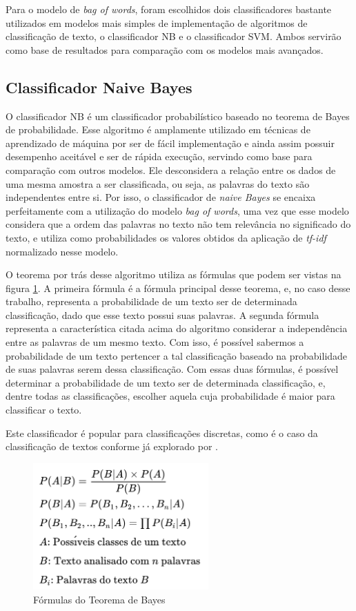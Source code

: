Para o modelo de \textit{bag of words}, foram escolhidos dois classificadores bastante utilizados em modelos mais simples de implementação de algoritmos de classificação de texto, o classificador NB e o classificador SVM. Ambos servirão como base de resultados para comparação com os modelos mais avançados.

\subsection{Classificador Naive Bayes}
\label{theoretical_NB}
O classificador NB é um classificador probabilístico baseado no teorema de Bayes de probabilidade. Esse algoritmo é amplamente utilizado em técnicas de aprendizado de máquina por ser de fácil implementação e ainda assim possuir desempenho aceitável e ser de rápida execução, servindo como base para comparação com outros modelos. Ele desconsidera a relação entre os dados de uma mesma amostra a ser classificada, ou seja, as palavras do texto são independentes entre si. Por isso, o classificador de \textit{naive Bayes} se encaixa perfeitamente com a utilização do modelo \textit{bag of words}, uma vez que esse modelo considera que a ordem das palavras no texto não tem relevância no significado do texto, e utiliza como probabilidades os valores obtidos da aplicação de \textit{tf-idf} normalizado nesse modelo. 

O teorema por trás desse algoritmo utiliza as fórmulas que podem ser vistas na figura \ref{fig:bayes_formulas}. A primeira fórmula é a fórmula principal desse teorema, e, no caso desse trabalho, representa a probabilidade de um texto ser de determinada classificação, dado que esse texto possui suas palavras. A segunda fórmula representa a característica citada acima do algoritmo considerar a independência entre as palavras de um mesmo texto. Com isso, é possível sabermos a probabilidade de um texto pertencer a tal classificação baseado na probabilidade de suas palavras serem dessa classificação. Com essas duas fórmulas, é possível determinar a probabilidade de um texto ser de determinada classificação, e, dentre todas as classificações, escolher aquela cuja probabilidade é maior para classificar o texto. 

Este classificador é popular para classificações discretas, como é o caso da classificação de textos conforme já explorado por \cite{McCallum98acomparison}.

\begin{figure}[!ht]
	\centering
    \includegraphics[width=0.6\textwidth]{figures/bayes_formulas.png}
    \caption{Fórmulas do Teorema de Bayes}
    \label{fig:bayes_formulas}
\end{figure}

